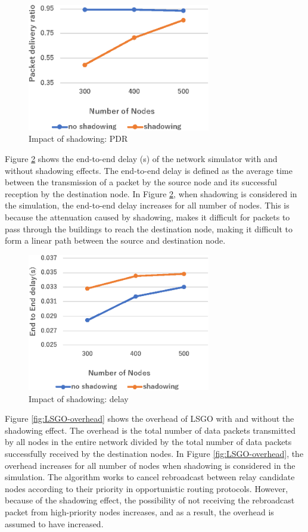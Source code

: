 \documentclass[conference]{IEEEtran}
\begin{document}
\begin{figure}[!ht]
\centering
\includegraphics[width=80mm]{figures/LSGO_PDR.eps}
\caption{Impact of shadowing: PDR }
\label{fig:LSGO-PDR}
\end{figure}


Figure \ref{fig:LSGO-delay} shows the end-to-end delay (s) of the network simulator with and without shadowing effects. The end-to-end delay is defined as the average time between the transmission of a packet by the source node and its successful reception by the destination node.
In Figure \ref{fig:LSGO-delay}, when shadowing is considered in the simulation, the end-to-end delay increases for all number of nodes. This is because the attenuation caused by shadowing, makes it difficult for packets to pass through the buildings to reach the destination node, making it difficult to form a linear path between the source and destination node.

\begin{figure}[!ht]
\centering
\includegraphics[width=80mm]{figures/LSGO_delay.eps}
\caption{Impact of shadowing: delay}
\label{fig:LSGO-delay}
\end{figure}

Figure \ref{fig:LSGO-overhead} shows the overhead of LSGO with and without the shadowing effect. 
The overhead is the total number of data packets transmitted by all nodes in the entire network divided by the total number of data packets successfully received by the destination nodes.
In Figure \ref{fig:LSGO-overhead}, the overhead increases for all number of nodes when shadowing is considered in the simulation.
The algorithm works to cancel rebroadcast between relay candidate nodes according to their priority in opportunistic routing protocols.
However, because of the shadowing effect, the possibility of not receiving the rebroadcast packet from high-priority nodes increases, and as a result, the overhead is assumed to have increased. 
 
\end{document}

